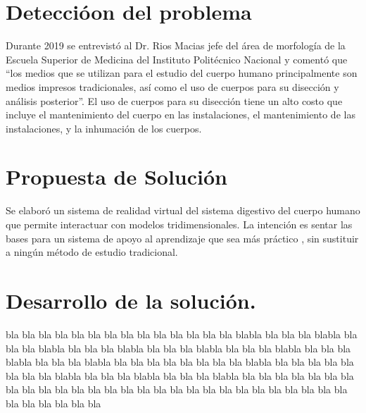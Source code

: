 \documentclass[11pt]{report}
\begin{document}
\newpage

\section{Detecci\'oon del problema} 

Durante 2019 se entrevistó al Dr. Rios Macias jefe del área de morfología de la Escuela Superior de Medicina del Instituto Politécnico Nacional y comentó que “los medios que se utilizan para el estudio del cuerpo humano principalmente son medios impresos tradicionales, así como el uso de cuerpos para su disección y análisis posterior”. El uso de cuerpos para su disección tiene un alto costo que incluye el mantenimiento del cuerpo en las instalaciones, el mantenimiento de las instalaciones, y la inhumación de los cuerpos.
\\
\newline
\section{Propuesta de Solución}

Se elaboró un sistema de realidad virtual del sistema digestivo del cuerpo humano que permite interactuar con modelos tridimensionales. La intención es sentar las bases para un sistema de apoyo al aprendizaje que sea más práctico \cite{moore1995learning}, sin sustituir a ningún método de estudio tradicional.
\\
\newline
\section{Desarrollo de la solución.}

bla bla bla bla bla bla bla bla bla bla bla bla bla bla blabla bla bla bla blabla bla bla bla blabla bla bla bla blabla bla bla bla blabla bla bla bla blabla bla bla bla blabla bla bla bla blabla bla bla bla bla bla bla bla bla blabla bla bla bla bla bla bla bla bla blabla bla bla bla blabla bla bla bla blabla bla bla bla bla bla bla bla bla bla bla bla bla bla bla bla bla bla bla bla bla bla bla bla bla bla bla bla bla bla bla bla bla bla bla
\end{document}
